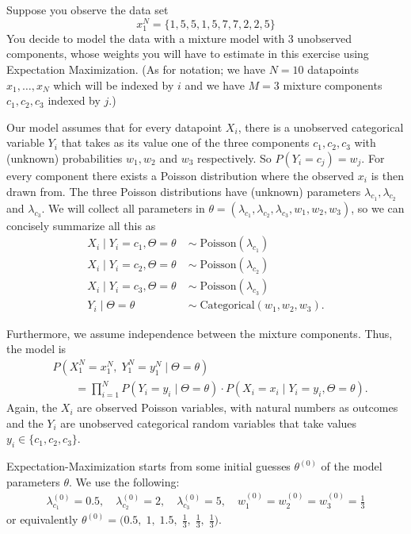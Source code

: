 \documentclass[a4paper,10pt,landscape,twocolumn]{scrartcl}
\begin{document}
\begin{exercise}
	Suppose you observe the data set 
	\[
		x_1^N = \{1, 5, 5, 1, 5, 7, 7, 2, 2, 5\}
	\] 
	You decide to model the data with a mixture model with 3 unobserved components, whose weights you will have to estimate in this exercise using Expectation Maximization. (As for notation; we have $N=10$ datapoints $x_1, \dots, x_N$ which will be indexed by $i$ and we have $M=3$ mixture components $c_1, c_2, c_3$ indexed by $j$.) 
	
	Our model assumes that for every datapoint $X_i$, there is a unobserved categorical variable $Y_i$ that takes as its value one of the three components $c_1, c_2, c_3$ with (unknown) probabilities $w_1, w_2$ and $w_3$ respectively. So $P(Y_i = c_j) = w_j$. For every component there exists a Poisson distribution where the observed $x_i$ is then drawn from. The three Poisson distributions have (unknown) parameters $\lambda_{c_{1}}, \lambda_{c_{2}}$ and $\lambda_{c_{3}}$. We will collect all parameters in $\theta = (\lambda_{c_1}, \lambda_{c_2}, \lambda_{c_3},w_1, w_2, w_3)$, so we can concisely summarize all this as
	\begin{align*}
		X_i \mid Y_i = c_1, \Theta=\theta \; &\sim \; \text{Poisson}(\lambda_{c_1})\\
		X_i \mid Y_i = c_2, \Theta=\theta \; &\sim \; \text{Poisson}(\lambda_{c_2})\\
		X_i \mid Y_i = c_3, \Theta=\theta \; &\sim \; \text{Poisson}(\lambda_{c_3})\\
		Y_i \mid \Theta=\theta \; &\sim \; \text{Categorical}(w_1, w_2, w_3).
	\end{align*}

	Furthermore, we assume independence between the mixture components. Thus, the model is
	\begin{align*}
	&P(X_1^N=x_1^N, \;Y_1^N=y_1^N\mid \Theta=\theta) \\
		&\qquad= \prod_{i=1}^N P(Y_{i}=y_{i} \mid \Theta=\theta) \cdot P(X_{i}=x_{i}\mid Y_{i}=y_{i}, \Theta=\theta).
	\end{align*}
	Again, the $X_i$ are observed Poisson variables, with natural numbers as outcomes and the $Y_i$ are unobserved categorical random variables that take values $y_i \in \{c_1, c_2, c_3\}$.
	
	Expectation-Maximization starts from some initial guesses $\theta^{(0)}$ of the model parameters $\theta$. We use the following:
	\begin{align*}
	 \lambda_{c_1}^{(0)}  = 0.5, \quad \lambda_{c_2}^{(0)} = 2, \quad
          \lambda_{c_3}^{(0)} = 5, \quad w_1^{(0)} = w_2^{(0)} = w_3^{(0)} = \frac{1}{3}
	\end{align*}
	or equivalently $\theta^{(0)} = \bigl(0.5,\; 1,\; 1.5, \; \frac{1}{3},\; \frac 1 3,\; \frac 1 3 \bigr)$.


\end{exercise}
\end{document}
